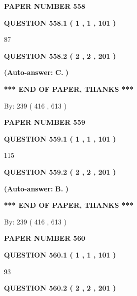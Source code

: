 \documentclass[12pt]{article}
\begin{document}
   
\newpage 
\setcounter{page}{ 
   558001 } 
   
   
 {\textbf{ \Large{ PAPER NUMBER  558  }}}
   
   
   
   
  
  
{\textbf{\large{QUESTION
558.1 
 ( 1 , 1 , 101 )
}}}

87
  
  
{\textbf{\large{QUESTION
558.2 
 ( 2 , 2 , 201 )
}}}
 
 
{\textbf{(Auto-answer:}}
{\textbf{\large{
C.}}}
{\textbf{)}}
 
 
   
   
   
   
\vspace{1.0in} 
{\textbf{\large{ *** END OF PAPER, THANKS *** }}} 
   
   
\hspace{1.0in} By: 
 239 ( 416 ,  613 )
   
   
   
   
\newpage 
\setcounter{page}{ 
   559001 } 
   
   
 {\textbf{ \Large{ PAPER NUMBER  559  }}}
   
   
   
   
  
  
{\textbf{\large{QUESTION
559.1 
 ( 1 , 1 , 101 )
}}}

115
  
  
{\textbf{\large{QUESTION
559.2 
 ( 2 , 2 , 201 )
}}}
 
 
{\textbf{(Auto-answer:}}
{\textbf{\large{
B.}}}
{\textbf{)}}
 
 
   
   
   
   
\vspace{1.0in} 
{\textbf{\large{ *** END OF PAPER, THANKS *** }}} 
   
   
\hspace{1.0in} By: 
 239 ( 416 ,  613 )
   
   
   
   
\newpage 
\setcounter{page}{ 
   560001 } 
   
   
 {\textbf{ \Large{ PAPER NUMBER  560  }}}
   
   
   
   
  
  
{\textbf{\large{QUESTION
560.1 
 ( 1 , 1 , 101 )
}}}

93
  
  
{\textbf{\large{QUESTION
560.2 
 ( 2 , 2 , 201 )
}}}
 
\end{document}

